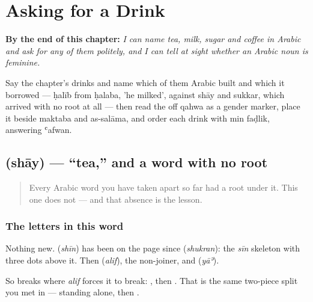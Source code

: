 
\chapter{Asking for a Drink}
\label{ch:ar-asking-for-a-drink}

\begin{chapteropening}
\textbf{By the end of this chapter:} \emph{I can name tea, milk, sugar and coffee in Arabic and ask for any of them politely, and I can tell at sight whether an Arabic noun is feminine.}

Say the chapter's drinks and name which of them Arabic built and which it borrowed — ḥalīb from ḥalaba, 'he milked', against shāy and sukkar, which arrived with no root at all — then read the  off qahwa as a gender marker, place it beside maktaba and as-salāma, and order each drink with min faḍlik, answering ʿafwan.
\end{chapteropening}

\section[\texorpdfstring{\ar{شاي} (shāy)}{شاي (shāy)}]{ (shāy) — \textquotedblleft{}tea,\textquotedblright{} and a word with no root}

\label{lesson:AR-C33-shay}



\begin{quote}
Every Arabic word you have taken apart so far had a root under it. This one does not — and that absence is the lesson.
\end{quote}

\subsection*{The letters in this word}
Nothing new. \textbf{} (\emph{shīn}) has been on the page since \textbf{} (\emph{shukran}): the \emph{sīn} skeleton with three dots above it. Then \textbf{} (\emph{alif}), the non-joiner, and \textbf{} (\emph{yāʾ}).

So \textbf{} breaks where \emph{alif} forces it to break: \textbf{}, then \textbf{}. That is the same two-piece split you met in \textbf{} — \textbf{} standing alone, then \textbf{}.

